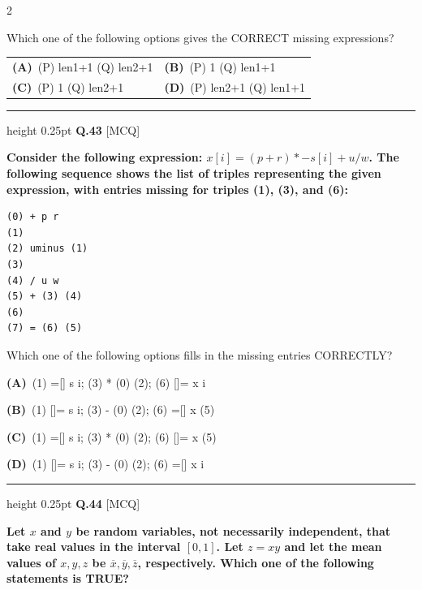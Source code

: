 \documentclass[a4paper,10pt,twoside]{article}
\begin{document}
\begin{multicols}{2}
{Which one of the following options gives the CORRECT missing expressions? \par}
\par\vspace{2pt}\noindent
\begin{tabular*}{\columnwidth}{@{\extracolsep{\fill}}p{}p{}@{}}
\textbf{(A)}~(P) len1+1 (Q) len2+1 & \textbf{(B)}~(P) 1 (Q) len1+1 \\
\addlinespace[2pt]
\textbf{(C)}~(P) 1 (Q) len2+1 & \textbf{(D)}~(P) len2+1 (Q) len1+1
\end{tabular*}
\par\vspace{6pt}\hrule height 0.25pt\vspace{6pt}
\noindent\textbf{Q.43} \hfill {\footnotesize\textsf{[MCQ]}}
\par\vspace{2pt}
{\bfseries Consider the following expression: $x[i] = (p + r) * -s[i] + u / w$. The following sequence shows the list of triples representing the given expression, with entries missing for triples (1), (3), and (6):
\begin{verbatim}
(0) + p r
(1)
(2) uminus (1)
(3)
(4) / u w
(5) + (3) (4)
(6)
(7) = (6) (5)
\end{verbatim}
Which one of the following options fills in the missing entries CORRECTLY? \par}
\par\vspace{2pt}\noindent
\textbf{(A)}~(1) =[] s i; (3) * (0) (2); (6) []= x i\par\vspace{2pt}\noindent
\textbf{(B)}~(1) []= s i; (3) - (0) (2); (6) =[] x (5)\par\vspace{2pt}\noindent
\textbf{(C)}~(1) =[] s i; (3) * (0) (2); (6) []= x (5)\par\vspace{2pt}\noindent
\textbf{(D)}~(1) []= s i; (3) - (0) (2); (6) =[] x i
\par\vspace{6pt}\hrule height 0.25pt\vspace{6pt}
\noindent\textbf{Q.44} \hfill {\footnotesize\textsf{[MCQ]}}
\par\vspace{2pt}
{\bfseries Let $x$ and $y$ be random variables, not necessarily independent, that take real values in the interval $[0,1]$. Let $z = xy$ and let the mean values of $x, y, z$ be $\overline{x}, \overline{y}, \overline{z}$, respectively. Which one of the following statements is TRUE? \par}

\end{multicols}
\end{document}
